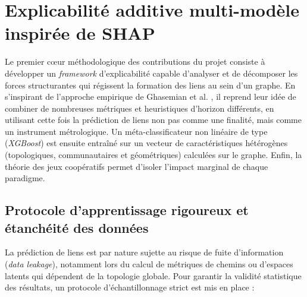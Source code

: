 \section{Explicabilité additive multi-modèle inspirée de SHAP}
\label{sec:shap_framework}

Le premier cœur méthodologique des contributions du projet consiste à développer un \textit{framework} d'explicabilité capable d'analyser et de décomposer les forces structurantes qui régissent la formation des liens au sein d'un graphe. En s'inspirant de l'approche empirique de Ghasemian et al. \cite{01stackingLinkPred}, il reprend leur idée de combiner de nombreuses métriques et heuristiques d'horizon différents, en utilisant cette fois la prédiction de liens non pas comme une finalité, mais comme un instrument métrologique. Un méta-classificateur non linéaire de type (\textit{XGBoost}) est ensuite entraîné sur un vecteur de caractéristiques hétérogènes (topologiques, communautaires et géométriques) calculées sur le graphe. Enfin,  la théorie des jeux coopératifs permet d'isoler l'impact marginal de chaque paradigme.

\subsection{Protocole d'apprentissage rigoureux et étanchéité des données}

La prédiction de liens est par nature sujette au risque de fuite d'information (\textit{data leakage}), notamment lors du calcul de métriques de chemins ou d'espaces latents qui dépendent de la topologie globale. Pour garantir la validité statistique des résultats, un protocole d'échantillonnage strict est mis en place :

